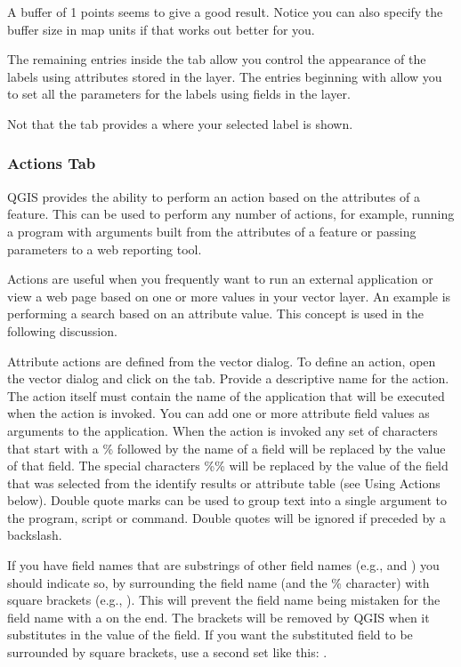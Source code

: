 A buffer of 1 points seems to give a good result.
Notice you can also specify the buffer size in map units if that works out
better for you.

The remaining entries inside the  tab allow you control the appearance of the
labels using attributes stored in the layer. The entries beginning with  allow you to
set all the parameters for the labels using fields in the layer.

Not that the  tab provides a  where your
selected label is shown.

\subsubsection{Actions Tab}\label{label_actions}

QGIS provides the ability to perform an action based on the attributes of a
feature. This can be used to perform any number of actions, for example,
running a program with arguments built from the attributes of a feature or
passing parameters to a web reporting tool.

Actions are useful when you frequently want to run an external application or
view a web page based on one or more values in your vector layer. An example
is performing a search based on an attribute value. This concept is used in 
the following discussion.


Attribute actions are defined from the vector  dialog. To
define an action, open the vector  dialog and click on the
 tab. Provide a descriptive name for the action. The action
itself must contain the name of the application that will be executed when the
action is invoked. You can add one or more attribute field values as arguments
to the application. When the action is invoked any set of characters that
start with a \% followed by the name of a field will be replaced by the value of
that field. The special characters \%\% \index{\%\%}will be replaced by the value
of the field that was selected from the identify results or attribute table (see
Using Actions below).  Double quote marks can be used to group text into a
single argument to the program, script or command. Double quotes will be
ignored if preceded by a backslash.

If you have field names that are substrings of other field names (e.g., 
and ) you should
indicate so, by surrounding the field name (and the \% character) with square
brackets (e.g., \usertext{[\%col10]}). This will prevent the  field
name being mistaken for the  field name with a 
on the end. The brackets will be removed by QGIS when it substitutes in the
value of the field. If you want the substituted field to be surrounded by square
brackets, use a second set like this: \usertext{[[\%col10]]}.

